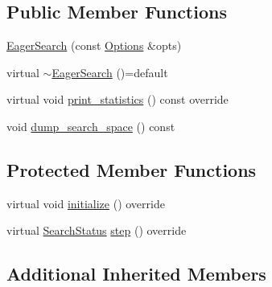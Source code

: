 \subsection*{Public Member Functions}
\begin{DoxyCompactItemize}
\item 
\hyperlink{classEagerSearch_a3c83aaaa9c15bd7e60cb239d2c329704}{Eager\-Search} (const \hyperlink{classOptions}{Options} \&opts)
\item 
virtual \hyperlink{classEagerSearch_af675ad5c78c5cfa73b464cf25e91e4e4}{$\sim$\-Eager\-Search} ()=default
\item 
virtual void \hyperlink{classEagerSearch_a96bb41d45681b398293fc53b43b73782}{print\-\_\-statistics} () const override
\item 
void \hyperlink{classEagerSearch_ade1c6231195370eeabe0d8a25998a81d}{dump\-\_\-search\-\_\-space} () const 
\end{DoxyCompactItemize}
\subsection*{Protected Member Functions}
\begin{DoxyCompactItemize}
\item 
virtual void \hyperlink{classEagerSearch_ad2a84b79cbb0db13f18d9e32996303e0}{initialize} () override
\item 
virtual \hyperlink{search__engine_8h_a366b21ffe1b22f34ec2fa8f101b979f3}{Search\-Status} \hyperlink{classEagerSearch_a579812c68f5321a6eb9e6fe0da59e14c}{step} () override
\end{DoxyCompactItemize}
\subsection*{Additional Inherited Members}


